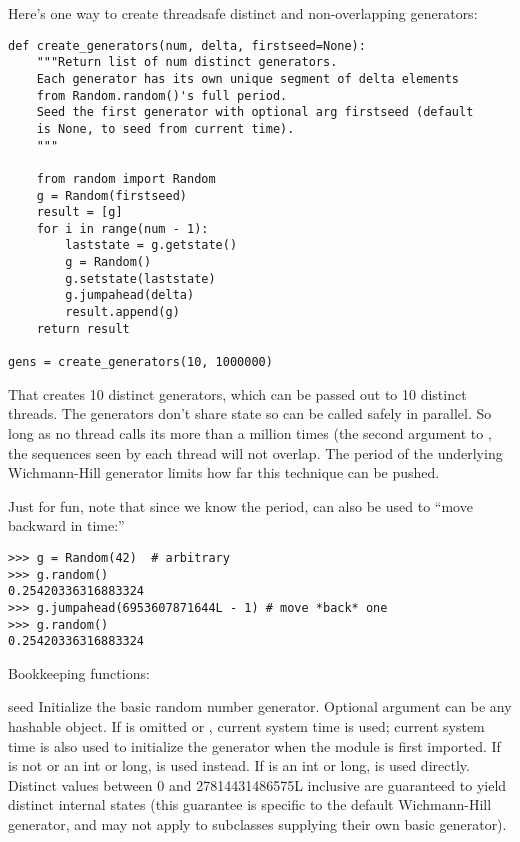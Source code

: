 Here's one way to create threadsafe distinct and non-overlapping generators:

\begin{verbatim}
def create_generators(num, delta, firstseed=None):
    """Return list of num distinct generators.
    Each generator has its own unique segment of delta elements
    from Random.random()'s full period.
    Seed the first generator with optional arg firstseed (default
    is None, to seed from current time).
    """

    from random import Random
    g = Random(firstseed)
    result = [g]
    for i in range(num - 1):
        laststate = g.getstate()
        g = Random()
        g.setstate(laststate)
        g.jumpahead(delta)
        result.append(g)
    return result

gens = create_generators(10, 1000000)
\end{verbatim}

That creates 10 distinct generators, which can be passed out to 10
distinct threads.  The generators don't share state so can be called
safely in parallel.  So long as no thread calls its 
more than a million times (the second argument to
, the sequences seen by each thread will
not overlap.  The period of the underlying Wichmann-Hill generator
limits how far this technique can be pushed.

Just for fun, note that since we know the period, 
can also be used to ``move backward in time:''

\begin{verbatim}
>>> g = Random(42)  # arbitrary
>>> g.random()
0.25420336316883324
>>> g.jumpahead(6953607871644L - 1) # move *back* one
>>> g.random()
0.25420336316883324
\end{verbatim}


Bookkeeping functions:

\begin{funcdesc}{seed}{}
  Initialize the basic random number generator.
  Optional argument  can be any hashable object.
  If  is omitted or , current system time is used;
  current system time is also used to initialize the generator when the
  module is first imported.
  If  is not  or an int or long,
   is used instead.
  If  is an int or long,  is used directly.
  Distinct values between 0 and 27814431486575L inclusive are guaranteed
  to yield distinct internal states (this guarantee is specific to the
  default Wichmann-Hill generator, and may not apply to subclasses
  supplying their own basic generator).
\end{funcdesc}

